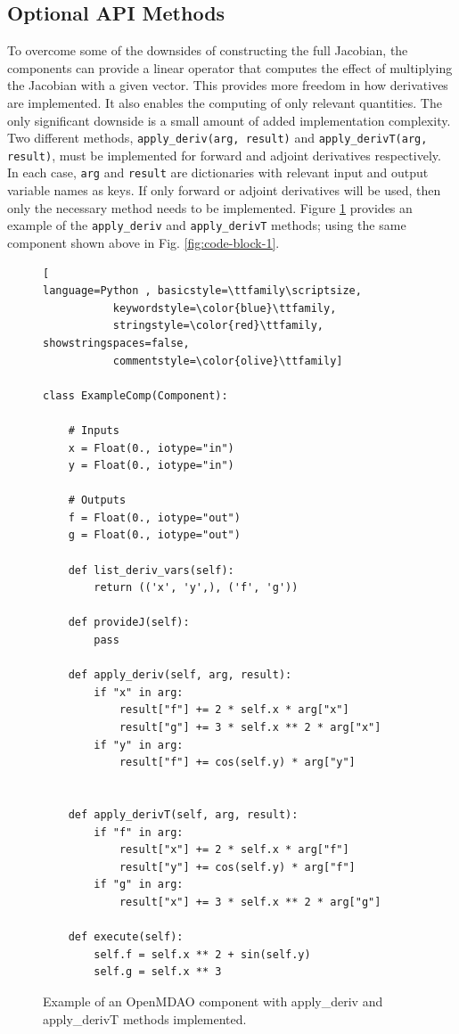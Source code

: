 \documentclass[]{aiaa-tc} %
\begin{document}
    \subsection{Optional API Methods}

        To overcome some of the downsides of constructing the full Jacobian, the components can provide
        a linear operator that computes the effect of multiplying the Jacobian with a given vector. This provides
        more freedom in how derivatives are implemented. It also enables the computing of only
        relevant quantities. The only significant downside is a small amount of added implementation complexity.
        Two different methods, \texttt{apply\_deriv(arg, result)} and \texttt{apply\_derivT(arg, result)}, must be implemented
        for forward and adjoint derivatives respectively. In each case, \texttt{arg} and \texttt{result}
        are dictionaries with relevant input and output variable names as keys.
        If only forward or adjoint derivatives will be used, then only the necessary method needs to be implemented. Figure \ref{code:component_with_apply_deriv} provides an example of
        the \texttt{apply\_deriv} and \texttt{apply\_derivT} methods; using the same component shown above in
        Fig. \ref{fig:code-block-1}.


\begin{figure}
\begin{minipage}{\textwidth}
\begin{lstlisting}[
language=Python , basicstyle=\ttfamily\scriptsize,
           keywordstyle=\color{blue}\ttfamily,
           stringstyle=\color{red}\ttfamily, showstringspaces=false,
           commentstyle=\color{olive}\ttfamily]

class ExampleComp(Component):

    # Inputs
    x = Float(0., iotype="in")
    y = Float(0., iotype="in")

    # Outputs
    f = Float(0., iotype="out")
    g = Float(0., iotype="out")

    def list_deriv_vars(self):
        return (('x', 'y',), ('f', 'g'))

    def provideJ(self):
        pass

    def apply_deriv(self, arg, result):
        if "x" in arg:
            result["f"] += 2 * self.x * arg["x"]
            result["g"] += 3 * self.x ** 2 * arg["x"]
        if "y" in arg:
            result["f"] += cos(self.y) * arg["y"]


    def apply_derivT(self, arg, result):
        if "f" in arg:
            result["x"] += 2 * self.x * arg["f"]
            result["y"] += cos(self.y) * arg["f"]
        if "g" in arg:
            result["x"] += 3 * self.x ** 2 * arg["g"]

    def execute(self):
        self.f = self.x ** 2 + sin(self.y)
        self.g = self.x ** 3

\end{lstlisting}
\caption{Example of an OpenMDAO
component with apply\_deriv and apply\_derivT methods implemented.
\label{code:component_with_apply_deriv}}
\end{minipage}

\end{figure}
\end{document}
